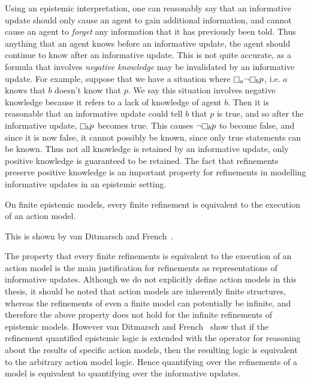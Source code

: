 Using an epistemic interpretation, one can reasonably say that an informative
update should only cause an agent to gain additional information, and cannot
cause an agent to {\em forget} any information that it has previously been told.
Thus anything that an agent knows before an informative update, the agent should
continue to know after an informative update. This is not quite accurate, as a
formula that involves {\em negative knowledge} may be invalidated by an
informative update. For example, suppose that we have a situation where
$\knows_a \neg \knows_b p$, i.e. $a$ knows that $b$ doesn't know that $p$. We
say this situation involves negative knowledge because it refers to a lack of
knowledge of agent $b$. Then it is reasonable that an informative update could
tell $b$ that $p$ is true, and so after the informative update, $\knows_b p$
becomes true.  This causes $\neg \knows_b p$ to become false, and since it is
now false, it cannot possibly be known, since only true statements can be
known. Thus not all knowledge is retained by an informative update, only
positive knowledge is guaranteed to be retained. The fact that refinements
preserve positive knowledge is an important property for refinements in
modelling informative updates in an epistemic setting.

\begin{proposition}
On finite epistemic models, every finite refinement is equivalent to the
execution of an action model.
\end{proposition}

This is shown by van Ditmarsch and French~\cite{french2009simulation}.

The property that every finite refinements is equivalent to the execution of an
action model is the main justification for refinements as representations of
informative updates. Although we do not explicitly define action models in this
thesis, it should be noted that action models are inherently finite structures,
whereas the refinements of even a finite model can potentially be infinite, and
therefore the above property does not hold for the infinite refinements of
epistemic models. However van Ditmarsch and French~\cite{french2009simulation}
show that if the refinement quantified epistemic logic is extended with the
operator for reasoning about the results of specific action models, then the
resulting logic is equivalent to the arbitrary action model logic. Hence
quantifying over the refinements of a model is equivalent to quantifying over
the informative updates.

